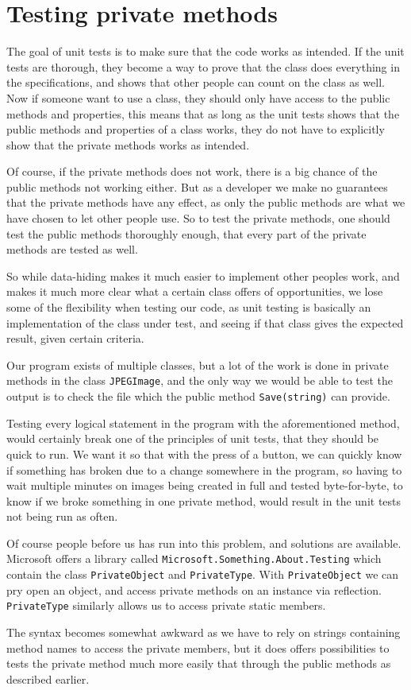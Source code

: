 \section{Testing private methods}
The goal of unit tests is to make sure that the code works as intended.
If the unit tests are thorough, they become a way to prove that the class does everything in the specifications, and shows that other people can count on the class as well.
Now if someone want to use a class, they should only have access to the public methods and properties, this means that as long as the unit tests shows that the public methods and properties of a class works, they do not have to explicitly show that the private methods works as intended.

Of course, if the private methods does not work, there is a big chance of the public methods not working either.
But as a developer we make no guarantees that the private methods have any effect, as only the public methods are what we have chosen to let other people use. 
So to test the private methods, one should test the public methods thoroughly enough, that every part of the private methods are tested as well. 

So while data-hiding makes it much easier to implement other peoples work, and makes it much more clear what a certain class offers of opportunities, we lose some of the flexibility when testing our code, as unit testing is basically an implementation of the class under test, and seeing if that class gives the expected result, given certain criteria. 

Our program exists of multiple classes, but a lot of the work is done in private methods in the class \lstinline|JPEGImage|, and the only way we would be able to test the output is to check the file which the public method \lstinline|Save(string)| can provide.

Testing every logical statement in the program with the aforementioned method, would certainly break one of the principles of unit tests, that they should be quick to run.
We want it so that with the press of a button, we can quickly know if something has broken due to a change somewhere in the program, so having to wait multiple minutes on images being created in full and tested byte-for-byte, to know if we broke something in one private method, would result in the unit tests not being run as often. 

Of course people before us has run into this problem, and solutions are available.
Microsoft offers a library called \lstinline|Microsoft.Something.About.Testing| which contain the class \lstinline|PrivateObject| and \lstinline|PrivateType|.
With \lstinline|PrivateObject| we can pry open an object, and access private methods on an instance via reflection. \lstinline|PrivateType| similarly allows us to access private static members. 

The syntax becomes somewhat awkward as we have to rely on strings containing method names to access the private members, but it does offers possibilities to tests the private method much more easily that through the public methods as described earlier.